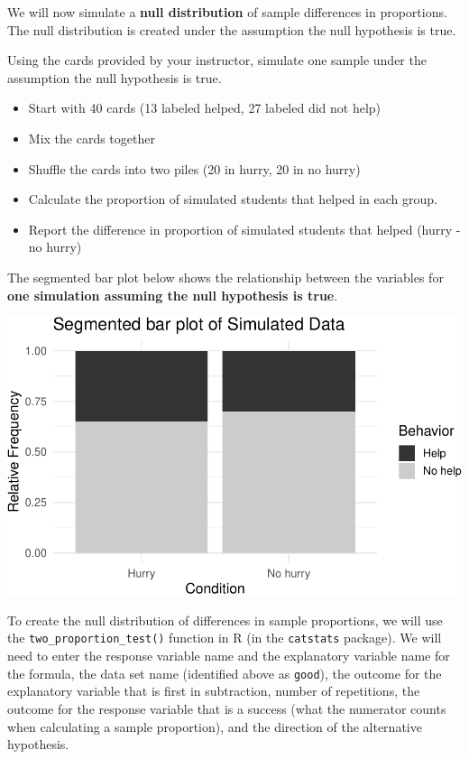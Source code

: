 \documentclass[
]{report}
\begin{document}
We will now simulate a \textbf{null distribution} of sample differences in proportions. The null distribution is created under the assumption the null hypothesis is true.

Using the cards provided by your instructor, simulate one sample under the assumption the null hypothesis is true.

\begin{itemize}
\item
  Start with 40 cards (13 labeled helped, 27 labeled did not help)
\item
  Mix the cards together
\item
  Shuffle the cards into two piles (20 in hurry, 20 in no hurry)
\item
  Calculate the proportion of simulated students that helped in each group.
\item
  Report the difference in proportion of simulated students that helped (hurry - no hurry)
\end{itemize}

The segmented bar plot below shows the relationship between the variables for \textbf{one simulation assuming the null hypothesis is true}.

\begin{center}\includegraphics[width=0.6\linewidth]{08-A18-inference-2cat-simulationtest_files/figure-latex/unnamed-chunk-4-1} \end{center}

\newpage

To create the null distribution of differences in sample proportions, we will use the \texttt{two\_proportion\_test()} function in R (in the \texttt{catstats} package). We will need to enter the response variable name and the explanatory variable name for the formula, the data set name (identified above as \texttt{good}), the outcome for the explanatory variable that is first in subtraction, number of repetitions, the outcome for the response variable that is a success (what the numerator counts when calculating a sample proportion), and the direction of the alternative hypothesis.
\end{document}
